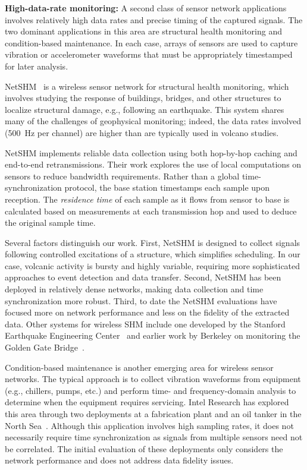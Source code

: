 {\bf High-data-rate monitoring:} A second class of sensor network
applications involves relatively high data rates and precise timing of the
captured signals. The two dominant applications in this area are structural
health monitoring and condition-based maintenance. In each case, arrays of
sensors are used to capture vibration or accelerometer waveforms that must be
appropriately timestamped for later analysis.

NetSHM~\cite{netshm-ewsnsubmission,netshm-emnets05,wisan} is a wireless
sensor network for structural health monitoring, which involves studying the
response of buildings, bridges, and other structures to localize structural
damage, e.g., following an earthquake. This system shares many of the
challenges of geophysical monitoring; indeed, the data rates involved (500~Hz
per channel) are higher than are typically used in volcano studies. 

NetSHM implements reliable data collection using both hop-by-hop caching and
end-to-end retransmissions. Their work explores the use of local computations
on sensors to reduce bandwidth requirements.  Rather than a global
time-synchronization protocol, the base station timestamps each sample upon
reception. The {\em residence time} of each sample as it flows from sensor to
base is calculated based on measurements at each transmission hop and used to
deduce the original sample time.

Several factors distinguish our work. First, NetSHM is designed to collect
signals following controlled excitations of a structure, which simplifies
scheduling.  In our case, volcanic activity is bursty and highly variable,
requiring more sophisticated approaches to event detection and data transfer.
Second, NetSHM has been deployed in relatively dense networks, making data
collection and time synchronization more robust.  Third, to date the NetSHM
evaluations have focused more on network performance and less on the fidelity
of the extracted data.  Other systems for wireless SHM include one developed
by the Stanford Earthquake Engineering
Center~\cite{wimms-lynch06,wimms-wang05} and earlier work by Berkeley on
monitoring the Golden Gate Bridge~\cite{ggb-monitoring}.

Condition-based maintenance is another emerging area for wireless sensor
networks. The typical approach is to collect vibration waveforms from
equipment (e.g., chillers, pumps, etc.) and perform time- and
frequency-domain analysis to determine when the equipment requires servicing.
Intel Research has explored this area through two deployments at a
fabrication plant and an oil tanker in the North
Sea~\cite{intel-northseasensys}. Although this application involves high
sampling rates, it does not necessarily require time synchronization as
signals from multiple sensors need not be correlated.  The initial evaluation
of these deployments only considers the network performance and does not
address data fidelity issues.

